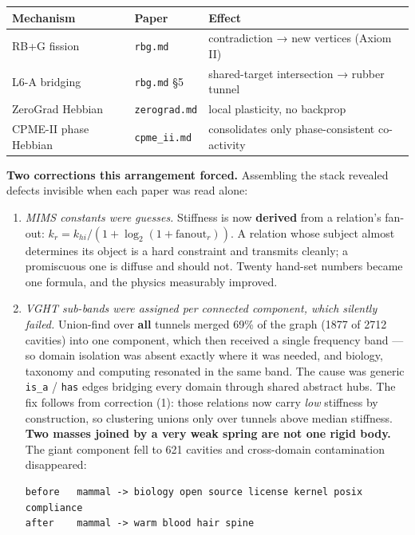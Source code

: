 \documentclass[
  11pt,
  a4paper,
]{article}
\begin{document}
\begin{longtable}[]{@{}
  >{\raggedright\arraybackslash}p{}
  >{\raggedright\arraybackslash}p{}
  >{\raggedright\arraybackslash}p{}@{}}
\toprule\noalign{}
\begin{minipage}[b]{\linewidth}\raggedright
Mechanism
\end{minipage} & \begin{minipage}[b]{\linewidth}\raggedright
Paper
\end{minipage} & \begin{minipage}[b]{\linewidth}\raggedright
Effect
\end{minipage} \\
\midrule\noalign{}
\endhead
\bottomrule\noalign{}
\endlastfoot
RB+G fission & \texttt{rbg.md} & contradiction → new vertices (Axiom
II) \\
L6-A bridging & \texttt{rbg.md} §5 & shared-target intersection → rubber
tunnel \\
ZeroGrad Hebbian & \texttt{zerograd.md} & local plasticity, no
backprop \\
CPME-II phase Hebbian & \texttt{cpme\_ii.md} & consolidates only
phase-consistent co-activity \\
\end{longtable}

\textbf{Two corrections this arrangement forced.} Assembling the stack
revealed defects invisible when each paper was read alone:

\begin{enumerate}
\def\labelenumi{\arabic{enumi}.}
\item
  \emph{MIMS constants were guesses.} Stiffness is now \textbf{derived}
  from a relation's fan-out:
  \(k_r = k_{hi}/(1 + \log_2(1 + \text{fanout}_r))\). A relation whose
  subject almost determines its object is a hard constraint and
  transmits cleanly; a promiscuous one is diffuse and should not. Twenty
  hand-set numbers became one formula, and the physics measurably
  improved.
\item
  \emph{VGHT sub-bands were assigned per connected component, which
  silently failed.} Union-find over \textbf{all} tunnels merged 69\% of
  the graph (1877 of 2712 cavities) into one component, which then
  received a single frequency band --- so domain isolation was absent
  exactly where it was needed, and biology, taxonomy and computing
  resonated in the same band. The cause was generic \texttt{is\_a} /
  \texttt{has} edges bridging every domain through shared abstract hubs.
  The fix follows from correction (1): those relations now carry
  \emph{low} stiffness by construction, so clustering unions only over
  tunnels above median stiffness. \textbf{Two masses joined by a very
  weak spring are not one rigid body.} The giant component fell to 621
  cavities and cross-domain contamination disappeared:

\begin{verbatim}
before   mammal -> biology open source license kernel posix compliance
after    mammal -> warm blood hair spine
\end{verbatim}
\end{enumerate}
\end{document}
